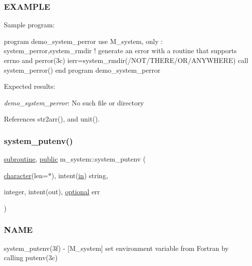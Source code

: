 \subsubsection*{E\+X\+A\+M\+P\+LE}

Sample program\+:

program demo\+\_\+system\+\_\+perror use M\+\_\+system, only \+: system\+\_\+perror,system\+\_\+rmdir ! generate an error with a routine that supports errno and perror(3c) ierr=system\+\_\+rmdir(\textquotesingle{}/\+N\+O\+T/\+T\+H\+E\+R\+E/\+O\+R/\+A\+N\+Y\+W\+H\+E\+RE\textquotesingle{}) call system\+\_\+perror(\textquotesingle{}) end program demo\+\_\+system\+\_\+perror

Expected results\+:

{\itshape demo\+\_\+system\+\_\+perror}\+: No such file or directory 

References str2arr(), and unit().

\mbox{\label{namespacem__system_af0c9df8e59cac9cd617cd1e20448ea7d}} 
\subsubsection{\texorpdfstring{system\+\_\+putenv()}{system\_putenv()}}
{\footnotesize\ttfamily \hyperlink{M__stopwatch_83_8txt_acfbcff50169d691ff02d4a123ed70482}{subroutine}, \hyperlink{M__stopwatch_83_8txt_a2f74811300c361e53b430611a7d1769f}{public} m\+\_\+system\+::system\+\_\+putenv (\begin{DoxyParamCaption}\item[{\hyperlink{option__stopwatch_83_8txt_abd4b21fbbd175834027b5224bfe97e66}{character}(len=$\ast$), intent(\hyperlink{M__journal_83_8txt_afce72651d1eed785a2132bee863b2f38}{in})}]{string,  }\item[{integer, intent(out), \hyperlink{option__stopwatch_83_8txt_aa4ece75e7acf58a4843f70fe18c3ade5}{optional}}]{err }\end{DoxyParamCaption})}



\subsubsection*{N\+A\+ME}

system\+\_\+putenv(3f) -\/ \mbox{[}M\+\_\+system\mbox{]} set environment variable from Fortran by calling putenv(3c) 

